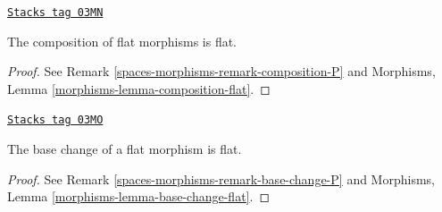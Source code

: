\begin{lemma}
\label{spaces-morphisms-lemma-composition-flat}
\href{https://stacks.math.columbia.edu/tag/03MN}{\texttt{Stacks tag 03MN}}

The composition of flat morphisms is flat.
\end{lemma}

\begin{proof}
See Remark \ref{spaces-morphisms-remark-composition-P} and
Morphisms, Lemma \ref{morphisms-lemma-composition-flat}.
\end{proof}

\begin{lemma}
\label{spaces-morphisms-lemma-base-change-flat}
\href{https://stacks.math.columbia.edu/tag/03MO}{\texttt{Stacks tag 03MO}}

The base change of a flat morphism is flat.
\end{lemma}

\begin{proof}
See Remark \ref{spaces-morphisms-remark-base-change-P} and
Morphisms, Lemma \ref{morphisms-lemma-base-change-flat}.
\end{proof}

